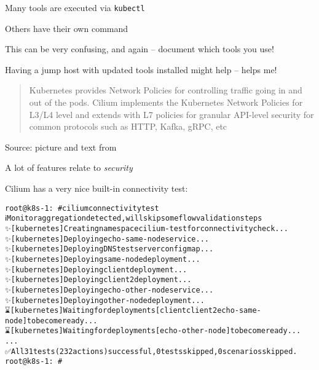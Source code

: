 \documentclass[Screen16to9,17pt]{foils}
\begin{document}
\begin{list2}
\item Many tools are executed via \verb+kubectl+
\item Others have their own command
\item This can be very confusing, and again -- document which tools you use!
\item Having a jump host with updated tools installed might help -- helps me!
\end{list2}



\begin{quote}
Kubernetes provides Network Policies for controlling traffic going in and out of the pods. Cilium implements the Kubernetes Network Policies for L3/L4 level and extends with L7 policies for granular API-level security for common protocols such as HTTP, Kafka, gRPC, etc
\end{quote}
Source: picture and text from 




\begin{list2}
\item A lot of features relate to \emph{security}
\end{list2}



Cilium has a very nice built-in connectivity test:
\begin{alltt}\footnotesize
root@k8s-1:~# cilium connectivity test
ℹ️  Monitor aggregation detected, will skip some flow validation steps
✨ [kubernetes] Creating namespace cilium-test for connectivity check...
✨ [kubernetes] Deploying echo-same-node service...
✨ [kubernetes] Deploying DNS test server configmap...
✨ [kubernetes] Deploying same-node deployment...
✨ [kubernetes] Deploying client deployment...
✨ [kubernetes] Deploying client2 deployment...
✨ [kubernetes] Deploying echo-other-node service...
✨ [kubernetes] Deploying other-node deployment...
⌛ [kubernetes] Waiting for deployments [client client2 echo-same-node] to become ready...
⌛ [kubernetes] Waiting for deployments [echo-other-node] to become ready...
...
✅ All 31 tests (232 actions) successful, 0 tests skipped, 0 scenarios skipped.
root@k8s-1:~#
\end{alltt}
\end{document}
